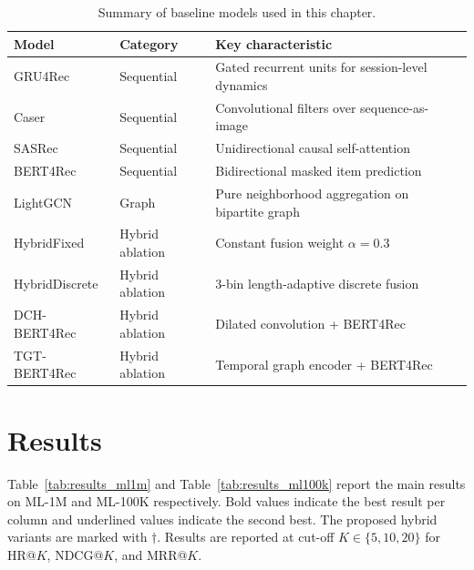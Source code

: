 \documentclass[12pt,a4paper]{report}
\begin{document}
\begin{table}[h]
\centering
\caption{Summary of baseline models used in this chapter.}
\label{tab:baselines}
\begin{tabular}{p{3.2cm} p{2.5cm} p{7.0cm}}
\toprule
\textbf{Model} & \textbf{Category} & \textbf{Key characteristic} \\
\midrule
GRU4Rec   & Sequential & Gated recurrent units for session-level dynamics \\
Caser     & Sequential & Convolutional filters over sequence-as-image \\
SASRec    & Sequential & Unidirectional causal self-attention \\
BERT4Rec  & Sequential & Bidirectional masked item prediction \\
LightGCN  & Graph      & Pure neighborhood aggregation on bipartite graph \\
HybridFixed    & Hybrid ablation & Constant fusion weight \(\alpha=0.3\) \\
HybridDiscrete & Hybrid ablation & 3-bin length-adaptive discrete fusion \\
DCH-BERT4Rec   & Hybrid ablation & Dilated convolution + BERT4Rec \\
TGT-BERT4Rec   & Hybrid ablation & Temporal graph encoder + BERT4Rec \\
\bottomrule
\end{tabular}
\end{table}

\section{Results}
\label{sec:results}

Table~\ref{tab:results_ml1m} and Table~\ref{tab:results_ml100k} report the
main results on ML-1M and ML-100K respectively. Bold values indicate the best
result per column and underlined values indicate the second best. The proposed
hybrid variants are marked with \(\dagger\). Results are reported at cut-off
\(K \in \{5, 10, 20\}\) for HR@\(K\), NDCG@\(K\), and MRR@\(K\).
\end{document}
